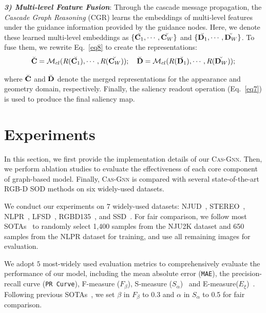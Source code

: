 \documentclass[runningheads]{llncs}
\begin{document}
\noindent \emph{\textbf{\footnotesize 3) Multi-level Feature Fusion}}: Through the cascade message propagation, the {\em Cascade Graph Reasoning} (CGR) learns the embeddings of multi-level features under the guidance information provided by the guidance nodes. Here, we denote these learned multi-level embeddings as $\{\Breve{\mathbf C_1},\cdots,\Breve{\mathbf C_W}\}$ and $\{\Breve{\mathbf D_1},\cdots,\Breve{\mathbf D_W}\}$. To fuse them, we rewrite Eq.~\ref{eq8} to create the representations:
\begin{equation}
\begin{aligned}
\Breve{\mathbf C} = \mathcal{M}_{cl} (R(\Breve{\mathbf C_1}),\cdots,R(\Breve{\mathbf C_W})); \quad \Breve{\mathbf D} = \mathcal{M}_{cl} (R(\Breve{\mathbf D_1}),\cdots,R(\Breve{\mathbf D_W}));
\label{eq12}
\end{aligned}
\end{equation}

\noindent where $\Breve{\mathbf C}$ and $\Breve{\mathbf D}$ denote the merged representations for the appearance and geometry domain, respectively. Finally, the saliency readout operation (Eq.~\ref{eq7}) is used to produce the final saliency map.

\section{ Experiments}
In this section, we first provide the implementation details of our {\scshape{Cas-Gnn}}. Then, we perform ablation studies to evaluate the effectiveness of each core component of graph-based model. Finally, {\scshape{Cas-Gnn}} is compared with several state-of-the-art RGB-D SOD methods on six widely-used datasets.  

 We conduct our experiments on $7$ widely-used datasets: NJUD~\cite{ju2014depth}, STEREO~\cite{niu2012leveraging}, NLPR~\cite{peng2014rgbd},  LFSD~\cite{li2014saliency}, RGBD135~\cite{cheng2014depth}, and SSD~\cite{zhu2017three}. For fair comparison, we follow most SOTAs~\cite{Chen_2018_CVPR,chen2019multi,han2017cnns} to randomly select 1,400 samples from the NJU2K dataset and 650 samples from the NLPR dataset for training, and use all remaining images for evaluation. 

 We adopt $5$ most-widely used evaluation metrics to comprehensively evaluate the performance of our model, including the mean absolute error ({\tt MAE}), the precision-recall curve ({\tt PR Curve}), F-measure ($F_{\beta}$), S-measure ($S_{\alpha}$)~\cite{fan2017structure} and E-measure($E_{\xi}$)~\cite{fan2018enhanced}. Following previous SOTAs~\cite{Chen_2018_CVPR,chen2019multi,han2017cnns}, we set $\beta$ in $F_{\beta}$ to $0.3$ and $\alpha$ in $S_{\alpha}$ to 0.5 for fair comparison.
\end{document}
